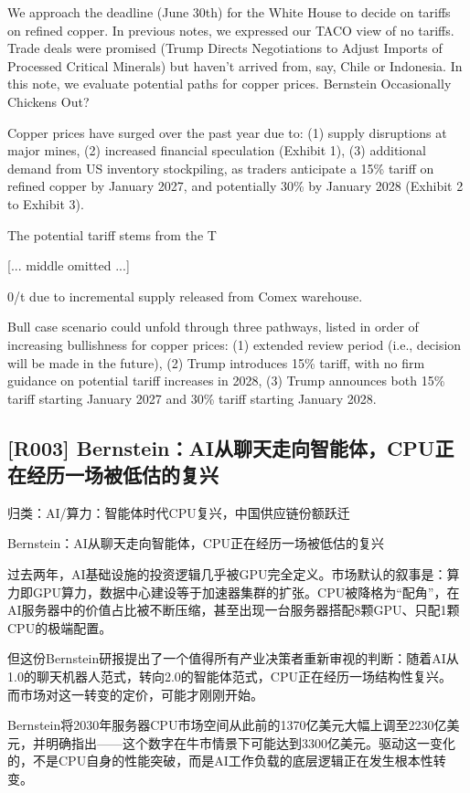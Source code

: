 \documentclass[11pt]{ctexart}
\begin{document}
We approach the deadline (June 30th) for the White House to decide on tariffs on refined copper. In previous notes, we expressed our TACO view of no tariffs. Trade deals were promised (Trump Directs Negotiations to Adjust Imports of Processed Critical Minerals) but haven't arrived from, say, Chile or Indonesia. In this note, we evaluate potential paths for copper prices. Bernstein Occasionally Chickens Out?

Copper prices have surged over the past year due to: (1) supply disruptions at major mines, (2) increased financial speculation (Exhibit 1), (3) additional demand from US inventory stockpiling, as traders anticipate a 15\% tariff on refined copper by January 2027, and potentially 30\% by January 2028 (Exhibit 2 to Exhibit 3).

The potential tariff stems from the T

[... middle omitted ...]

0/t due to incremental supply released from Comex warehouse.

Bull case scenario could unfold through three pathways, listed in order of increasing bullishness for copper prices: (1) extended review period (i.e., decision will be made in the future), (2) Trump introduces 15\% tariff, with no firm guidance on potential tariff increases in 2028, (3) Trump announces both 15\% tariff starting January 2027 and 30\% tariff starting January 2028.

\subsection{[R003] Bernstein：AI从聊天走向智能体，CPU正在经历一场被低估的复兴}
{\small\color{refgray}归类：AI/算力：智能体时代CPU复兴，中国供应链份额跃迁}

Bernstein：AI从聊天走向智能体，CPU正在经历一场被低估的复兴

过去两年，AI基础设施的投资逻辑几乎被GPU完全定义。市场默认的叙事是：算力即GPU算力，数据中心建设等于加速器集群的扩张。CPU被降格为“配角”，在AI服务器中的价值占比被不断压缩，甚至出现一台服务器搭配8颗GPU、只配1颗CPU的极端配置。

但这份Bernstein研报提出了一个值得所有产业决策者重新审视的判断：随着AI从1.0的聊天机器人范式，转向2.0的智能体范式，CPU正在经历一场结构性复兴。 而市场对这一转变的定价，可能才刚刚开始。

Bernstein将2030年服务器CPU市场空间从此前的1370亿美元大幅上调至2230亿美元，并明确指出——这个数字在牛市情景下可能达到3300亿美元。驱动这一变化的，不是CPU自身的性能突破，而是AI工作负载的底层逻辑正在发生根本性转变。
\end{document}
